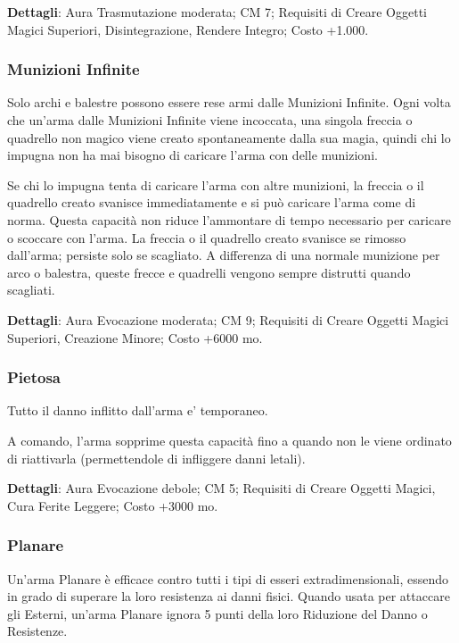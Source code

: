 \begin{multicols}{2}
\textbf{Dettagli}: Aura Trasmutazione moderata; CM 7; Requisiti di Creare Oggetti Magici Superiori, Disintegrazione, Rendere Integro; Costo +1.000.

\subsubsection{Munizioni Infinite}

Solo archi e balestre possono essere rese armi dalle Munizioni Infinite. Ogni volta che un'arma dalle Munizioni Infinite viene incoccata, una singola freccia o quadrello non magico viene creato spontaneamente dalla sua magia, quindi chi lo impugna non ha mai bisogno di caricare l'arma con delle munizioni.

Se chi lo impugna tenta di caricare l'arma con altre munizioni, la freccia o il quadrello creato svanisce immediatamente e si può caricare l'arma come di norma. Questa capacità non riduce l'ammontare di tempo necessario per caricare o scoccare con l'arma. La freccia o il quadrello creato svanisce se rimosso dall'arma; persiste solo se scagliato. A differenza di una normale munizione per arco o balestra, queste frecce e quadrelli vengono sempre distrutti quando scagliati.

\textbf{Dettagli}: Aura Evocazione moderata; CM 9; Requisiti di Creare Oggetti Magici Superiori, Creazione Minore; Costo +6000 mo.

\subsubsection{Pietosa}

Tutto il danno inflitto dall'arma e' temporaneo.

A comando, l'arma sopprime questa capacità fino a quando non le viene ordinato di riattivarla (permettendole di infliggere danni letali).

\textbf{Dettagli}: Aura Evocazione debole; CM 5; Requisiti di Creare Oggetti Magici, Cura Ferite Leggere; Costo +3000 mo.

\subsubsection{Planare}

Un'arma Planare è efficace contro tutti i tipi di esseri extradimensionali, essendo in grado di superare la loro resistenza ai danni fisici. Quando usata per attaccare gli Esterni, un'arma Planare ignora 5 punti della loro Riduzione del Danno o Resistenze.


\end{multicols}
